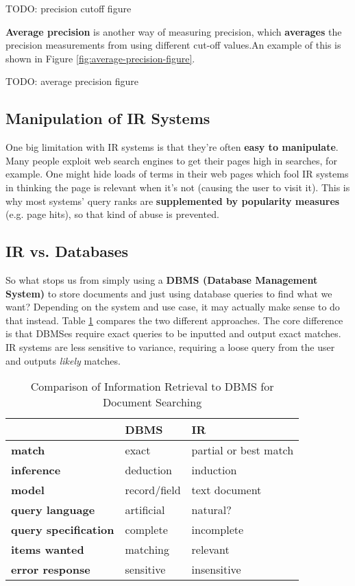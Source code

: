 \documentclass{article}
\begin{document}
TODO: precision cutoff figure

\textbf{Average precision} is another way of measuring precision, which \textbf{averages} the precision measurements from using different cut-off values.An example of this is shown in Figure \ref{fig:average-precision-figure}.

TODO: average precision figure

\subsection{Manipulation of IR Systems}

One big limitation with IR systems is that they're often \textbf{easy to manipulate}. Many people exploit web search engines to get their pages high in searches, for example. One might hide loads of terms in their web pages which fool IR systems in thinking the page is relevant when it's not (causing the user to visit it). This is why most systems' query ranks are \textbf{supplemented by popularity measures} (e.g. page hits), so that kind of abuse is prevented.

\subsection{IR vs. Databases}

So what stops us from simply using a \textbf{DBMS (Database Management System)} to store documents and just using database queries to find what we want? Depending on the system and use case, it may actually make sense to do that instead. Table \ref{tab:ir-db-comparison} compares the two different approaches. The core difference is that DBMSes require exact queries to be inputted and output exact matches. IR systems are less sensitive to variance, requiring a loose query from the user and outputs \textit{likely} matches.
 
\begin{table}
	\centering
	\begin{tabular}{|l|l|l|}
		\hline
		& \textbf{DBMS} & \textbf{IR} \\
		\hline
		\textbf{match} & exact & partial or best match \\
		\textbf{inference} & deduction & induction \\
		\textbf{model} & record/field & text document \\
		\textbf{query language} & artificial & natural? \\
		\textbf{query specification} & complete & incomplete \\
		\textbf{items wanted} & matching & relevant \\
		\textbf{error response} & sensitive & insensitive \\
		\hline
	\end{tabular}
	\caption{Comparison of Information Retrieval to DBMS for Document Searching}
	\label{tab:ir-db-comparison}
\end{table}
\end{document}
